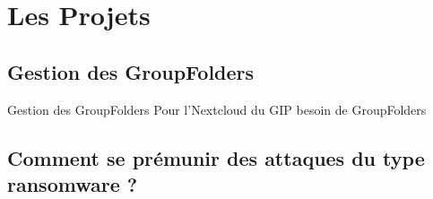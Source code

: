 \section*{Les Projets}
\subsection*{Gestion des GroupFolders}
\begin{frame}{Gestion des GroupFolders}
Pour l'Nextcloud du GIP besoin de GroupFolders 
\end{frame}
\subsection*{Comment se prémunir des attaques du type ransomware ?}
\begin{frame}

\end{frame}